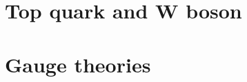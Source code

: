 \documentclass [12pt]{article}
\begin{document}


\section{Top quark and W boson}


\section{Gauge theories}

\end{document}
